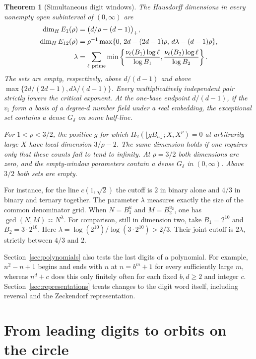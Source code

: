 \documentclass[11pt,reqno,a4paper]{amsart}
\newtheorem{theorem}{Theorem}[section]
\theoremstyle{remark}
\begin{document}
\begin{theorem}[Simultaneous digit windows]\label{thm:dimension}
The Hausdorff dimensions in every nonempty open subinterval of
\((0,\infty)\) are
\begin{align*}
 \dim_H E_1(\rho)&=\bigl(d/\rho-(d-1)\bigr)_+,\\
 \dim_H E_{12}(\rho)&=\rho^{-1}\max\{0,\,2d-(2d-1)\rho,\,
                                      d\lambda-(d-1)\rho\},\\
 \lambda&=\sum_{\ell\ {\rm prime}}
     \min\left\{\frac{\nu_\ell(B_1)\log\ell}{\log B_1},
                 \frac{\nu_\ell(B_2)\log\ell}{\log B_2}\right\}.
\end{align*}
The sets are empty, respectively, above \(d/(d-1)\) and above
\(\max\{2d/(2d-1),d\lambda/(d-1)\}\). Every multiplicatively
independent pair strictly lowers the critical exponent.
At the one-base endpoint \(d/(d-1)\), if the \(v_i\) form a basis
of a degree-\(d\) number field under a real embedding, the exceptional
set contains a dense \(G_\delta\) on some half-line.

For \(1<\rho<3/2\), the positive \(g\) for which
\(H_2(\lfloor gB_n\rfloor;X,X^\rho)=0\) at arbitrarily large \(X\)
have local dimension \(3/\rho-2\). The same dimension holds if one
requires only that these counts fail to tend to infinity. At \(\rho=3/2\)
both dimensions are zero, and the empty-window parameters contain a
dense \(G_\delta\) in \((0,\infty)\). Above \(3/2\) both sets are empty.
\end{theorem}

For instance, for the line \(c(1,\sqrt2)\) the cutoff is \(2\) in
binary alone and \(4/3\) in binary and ternary together. The parameter
\(\lambda\) measures exactly the size of the common denominator grid.
When \(N=B_1^u\) and \(M=B_2^{u_2}\), one has \(\gcd(N,M)\asymp N^\lambda\).
For comparison, still in dimension two, take \(B_1=2^{10}\) and
\(B_2=3\cdot 2^{10}\). Here \(\lambda=\log(2^{10})/\log(3\cdot 2^{10})>2/3\).
Their joint cutoff is \(2\lambda\), strictly between \(4/3\) and \(2\).

Section~\ref{sec:polynomials} also tests the last digits of a polynomial.
For example, \(n^2-n+1\) begins and ends with \(n\) at \(n=b^m+1\)
for every sufficiently large \(m\), whereas \(n^d+c\) does this only
finitely often for each fixed \(b,d\ge2\) and integer \(c\).
Section~\ref{sec:representations} treats changes to the digit word
itself, including reversal and the Zeckendorf representation.

\section{From leading digits to orbits on the circle}\label{sec:transfer}
\end{document}
